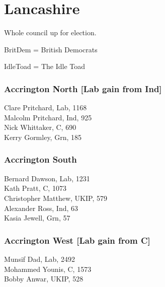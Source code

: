 \documentclass[a4paper,openany,10pt]{book}
\begin{document}
\vfill

\section{Lancashire}

Whole council up for election.

BritDem = British Democrats

IdleToad = The Idle Toad



\subsubsection*{Accrington North \hspace*{\fill}\nolinebreak[1]%
\enspace\hspace*{\fill}
[Lab gain from Ind]}



Clare Pritchard, Lab, 1168\\
Malcolm Pritchard, Ind, 925\\
Nick Whittaker, C, 690\\
Kerry Gormley, Grn, 185\\


\subsubsection*{Accrington South}



Bernard Dawson, Lab, 1231\\
Kath Pratt, C, 1073\\
Christopher Matthew, UKIP, 579\\
Alexander Ross, Ind, 63\\
Kasia Jewell, Grn, 57\\


\subsubsection*{Accrington West \hspace*{\fill}\nolinebreak[1]%
\enspace\hspace*{\fill}
[Lab gain from C]}



Munsif Dad, Lab, 2492\\
Mohammed Younis, C, 1573\\
Bobby Anwar, UKIP, 528\\
\end{document}

